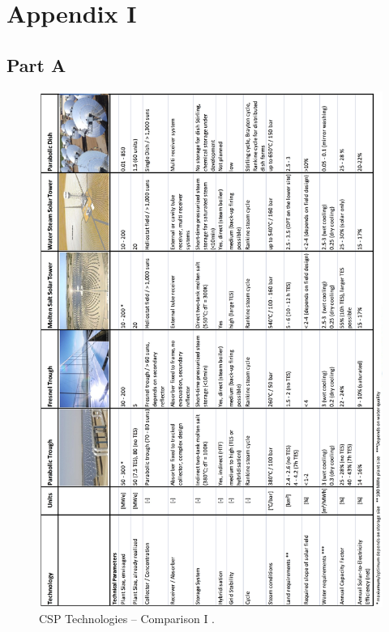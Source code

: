 \chapter{Appendix I}
\section{Part A}
\begin{figure}[h]  
\centering
\includegraphics[height=0.95\textheight]{FIG/CSPOverview1}
\caption[CSP Technologies – Comparison I]{CSP Technologies – Comparison I \cite{Fichtner2010}.}\label{CSPOverview1}
\end{figure}
